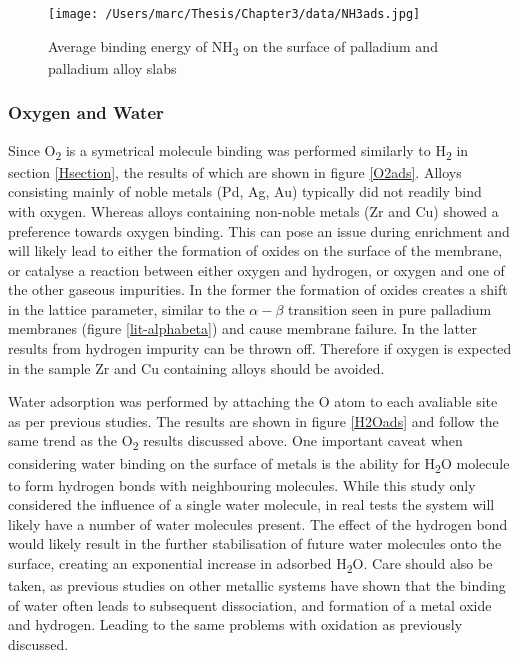  \begin{figure}
      \centering
      \texttt{[image: /Users/marc/Thesis/Chapter3/data/NH3ads.jpg]}
      \caption{Average binding energy of NH\textsubscript{3} on the surface of palladium and palladium alloy slabs}
      \label{nh3ads}
    \end{figure}
  
\subsubsection{Oxygen and Water}
Since O\textsubscript{2} is a symetrical molecule binding was performed similarly to H\textsubscript{2} in section \ref{Hsection}, the results of which are shown in figure \ref{O2ads}. Alloys consisting mainly of noble metals (Pd, Ag, Au) typically did not readily bind with oxygen. Whereas alloys containing non-noble metals (Zr and Cu) showed a preference towards oxygen binding. This can pose an issue during enrichment and will likely lead to either the formation of oxides on the surface of the membrane, or catalyse a reaction between either oxygen and hydrogen, or oxygen and one of the other gaseous impurities. In the former the formation of oxides creates a shift in the lattice parameter, similar to the $\alpha - \beta$ transition seen in pure palladium membranes (figure \ref{lit-alphabeta})\cite{Li2008b} and cause membrane failure. In the latter results from hydrogen impurity can be thrown off. Therefore if oxygen is expected in the sample Zr and Cu containing alloys should be avoided.

Water adsorption was performed by attaching the O atom to each avaliable site as per previous studies. \cite{Roques2009} The results are shown in figure \ref{H2Oads} and follow the same trend as the O\textsubscript{2} results discussed above. One important caveat when considering water binding on the surface of metals is the ability for H\textsubscript{2}O molecule to form hydrogen bonds with neighbouring molecules.\cite{PhysRevB.69.195404} While this study only considered the influence of a single water molecule, in real tests the system will likely have a number of water molecules present. The effect of the hydrogen bond would likely result in the further stabilisation of future water molecules onto the surface, creating an exponential increase in adsorbed H\textsubscript{2}O. \cite{PhysRevB.69.195404} Care should also be taken, as previous studies on other metallic systems have shown that the binding of water often leads to subsequent dissociation, and formation of a metal oxide and hydrogen. Leading to the same problems with oxidation as previously discussed. \cite{doi:10.1021/jz300994e}

